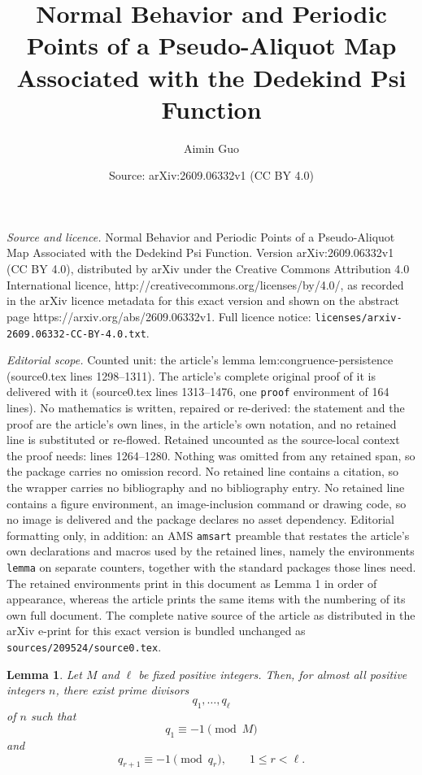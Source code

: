 \documentclass[10pt,a4paper]{amsart}
\title{Normal Behavior and Periodic Points of a Pseudo-Aliquot Map Associated with the Dedekind Psi Function}
\author{Aimin Guo}
\date{Source: arXiv:2609.06332v1 (CC BY 4.0)}
\newtheorem{lemma}{Lemma}
\begin{document}
\maketitle

\noindent\emph{Source and licence.} Normal Behavior and Periodic Points of a Pseudo-Aliquot Map Associated with the Dedekind Psi Function. Version arXiv:2609.06332v1 (CC BY 4.0), distributed by arXiv under the Creative Commons Attribution 4.0 International licence, http://creativecommons.org/licenses/by/4.0/, as recorded in the arXiv licence metadata for this exact version and shown on the abstract page https://arxiv.org/abs/2609.06332v1. Full licence notice: \texttt{licenses/arxiv-2609.06332-CC-BY-4.0.txt}.\par\smallskip

\noindent\textit{Editorial scope.} Counted unit: the article's lemma lem:congruence-persistence (source0.tex lines 1298--1311). The article's complete original proof of it is delivered with it (source0.tex lines 1313--1476, one \texttt{proof} environment of 164 lines). No mathematics is written, repaired or re-derived: the statement and the proof are the article's own lines, in the article's own notation, and no retained line is substituted or re-flowed.  Retained uncounted as the source-local context the proof needs: lines 1264--1280.  Nothing was omitted from any retained span, so the package carries no omission record.  No retained line contains a citation, so the wrapper carries no bibliography and no bibliography entry.  No retained line contains a figure environment, an image-inclusion command or drawing code, so no image is delivered and the package declares no asset dependency.  Editorial formatting only, in addition: an AMS \texttt{amsart} preamble that restates the article's own declarations and macros used by the retained lines, namely the environments \texttt{lemma} on separate counters, together with the standard packages those lines need.  The retained environments print in this document as Lemma 1 in order of appearance, whereas the article prints the same items with the numbering of its own full document.  The complete native source of the article as distributed in the arXiv e-print for this exact version is bundled unchanged as \texttt{sources/209524/source0.tex}.
\begin{lemma}\label{lem:prime-chain}
Let $M$ and $\ell$ be fixed positive integers. Then, for almost all
positive integers $n$, there exist prime divisors
\[
q_1,\ldots,q_\ell
\]
of $n$ such that
\[
q_1\equiv-1\pmod M
\]
and
\[
q_{r+1}\equiv-1\pmod{q_r},
\qquad
1\le r<\ell.
\]
\end{lemma}
\end{document}
